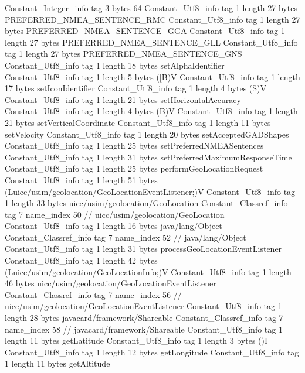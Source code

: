 {{{		}
		Constant_Integer_info {
			tag	3
			bytes	64
		}
		Constant_Utf8_info {
			tag	1
			length	27
			bytes	PREFERRED_NMEA_SENTENCE_RMC
		}
		Constant_Utf8_info {
			tag	1
			length	27
			bytes	PREFERRED_NMEA_SENTENCE_GGA
		}
		Constant_Utf8_info {
			tag	1
			length	27
			bytes	PREFERRED_NMEA_SENTENCE_GLL
		}
		Constant_Utf8_info {
			tag	1
			length	27
			bytes	PREFERRED_NMEA_SENTENCE_GNS
		}
		Constant_Utf8_info {
			tag	1
			length	18
			bytes	setAlphaIdentifier
		}
		Constant_Utf8_info {
			tag	1
			length	5
			bytes	([B)V
		}
		Constant_Utf8_info {
			tag	1
			length	17
			bytes	setIconIdentifier
		}
		Constant_Utf8_info {
			tag	1
			length	4
			bytes	(S)V
		}
		Constant_Utf8_info {
			tag	1
			length	21
			bytes	setHorizontalAccuracy
		}
		Constant_Utf8_info {
			tag	1
			length	4
			bytes	(B)V
		}
		Constant_Utf8_info {
			tag	1
			length	21
			bytes	setVerticalCoordinate
		}
		Constant_Utf8_info {
			tag	1
			length	11
			bytes	setVelocity
		}
		Constant_Utf8_info {
			tag	1
			length	20
			bytes	setAcceptedGADShapes
		}
		Constant_Utf8_info {
			tag	1
			length	25
			bytes	setPreferredNMEASentences
		}
		Constant_Utf8_info {
			tag	1
			length	31
			bytes	setPreferredMaximumResponseTime
		}
		Constant_Utf8_info {
			tag	1
			length	25
			bytes	performGeoLocationRequest
		}
		Constant_Utf8_info {
			tag	1
			length	51
			bytes	(Luicc/usim/geolocation/GeoLocationEventListener;)V
		}
		Constant_Utf8_info {
			tag	1
			length	33
			bytes	uicc/usim/geolocation/GeoLocation
		}
		Constant_Classref_info {
			tag	7
			name_index	50		// uicc/usim/geolocation/GeoLocation
		}
		Constant_Utf8_info {
			tag	1
			length	16
			bytes	java/lang/Object
		}
		Constant_Classref_info {
			tag	7
			name_index	52		// java/lang/Object
		}
		Constant_Utf8_info {
			tag	1
			length	31
			bytes	processGeoLocationEventListener
		}
		Constant_Utf8_info {
			tag	1
			length	42
			bytes	(Luicc/usim/geolocation/GeoLocationInfo;)V
		}
		Constant_Utf8_info {
			tag	1
			length	46
			bytes	uicc/usim/geolocation/GeoLocationEventListener
		}
		Constant_Classref_info {
			tag	7
			name_index	56		// uicc/usim/geolocation/GeoLocationEventListener
		}
		Constant_Utf8_info {
			tag	1
			length	28
			bytes	javacard/framework/Shareable
		}
		Constant_Classref_info {
			tag	7
			name_index	58		// javacard/framework/Shareable
		}
		Constant_Utf8_info {
			tag	1
			length	11
			bytes	getLatitude
		}
		Constant_Utf8_info {
			tag	1
			length	3
			bytes	()I
		}
		Constant_Utf8_info {
			tag	1
			length	12
			bytes	getLongitude
		}
		Constant_Utf8_info {
			tag	1
			length	11
			bytes	getAltitude
}}}
